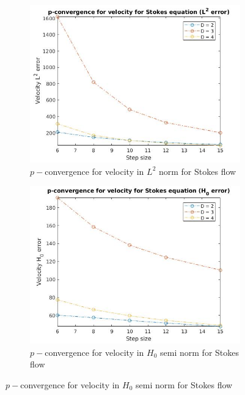 \documentclass{beamer}
\begin{document}
\begin{frame}
\begin{figure}
\begin{subfigure}{0.3\textwidth}
\centering
  \includegraphics[width=\linewidth]{p_conv_velocity_l2_stokes.jpg}
  \caption{$p-$convergence for velocity in $L^2$ norm for Stokes flow}
  \label{p_convergence_velocity_l2}
\end{subfigure}
\begin{subfigure}{0.3\textwidth}
\centering
  \includegraphics[width=\linewidth]{p_conv_velocity_h0_stokes.jpg}
  \caption{$p-$convergence for velocity in $H_0$ semi norm for Stokes flow}
  \label{p_convergence_velocity_h0}
\end{subfigure}

\end{figure}
\end{frame}
\end{document}
